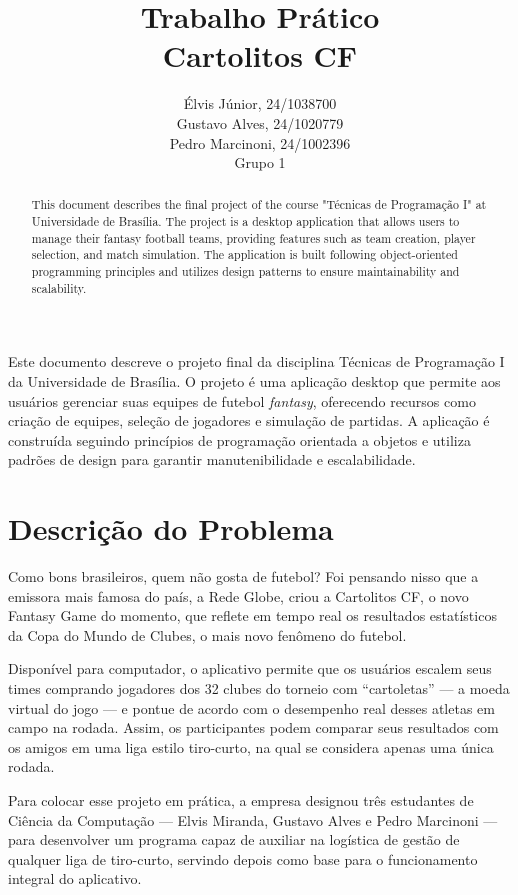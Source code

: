 \documentclass[12pt]{article}
\title{Trabalho Prático\\ 
Cartolitos CF}
\author{Élvis Júnior, 24/1038700\\
        Gustavo Alves, 24/1020779\\
        Pedro Marcinoni, 24/1002396\\
        Grupo 1
}
\begin{document}
\maketitle

\begin{abstract}
  This document describes the final project of the course "Técnicas de Programação I" at Universidade de Brasília. The project is a desktop application that allows users to manage their fantasy football teams, providing features such as team creation, player selection, and match simulation. The application is built following object-oriented programming principles and utilizes design patterns to ensure maintainability and scalability.
\end{abstract}

\begin{resumo}
  Este documento descreve o projeto final da disciplina Técnicas de Programação I da Universidade de Brasília. O projeto é uma aplicação desktop que permite aos usuários gerenciar suas equipes de futebol \textit{fantasy}, oferecendo recursos como criação de equipes, seleção de jogadores e simulação de partidas. A aplicação é construída seguindo princípios de programação orientada a objetos e utiliza padrões de design para garantir manutenibilidade e escalabilidade.
\end{resumo}


\section{Descrição do Problema}
\label{sec:descricao}

Como bons brasileiros, quem não gosta de futebol? Foi pensando nisso que a emissora mais famosa do país, a Rede Globe, criou a Cartolitos CF, o novo Fantasy Game \cite{wiki:cartola} do momento, que reflete em tempo real os resultados estatísticos da Copa do Mundo de Clubes, o mais novo fenômeno do futebol.

Disponível para computador, o aplicativo permite que os usuários escalem seus times comprando jogadores dos 32 clubes do torneio com “cartoletas” — a moeda virtual do jogo — e pontue de acordo com o desempenho real desses atletas em campo na rodada. Assim, os participantes podem comparar seus resultados com os amigos em uma liga estilo tiro-curto, na qual se considera apenas uma única rodada.

Para colocar esse projeto em prática, a empresa designou três estudantes de Ciência da Computação — Elvis Miranda, Gustavo Alves e Pedro Marcinoni — para desenvolver um programa capaz de auxiliar na logística de gestão de qualquer liga de tiro-curto, servindo depois como base para o funcionamento integral do aplicativo.
\end{document}
